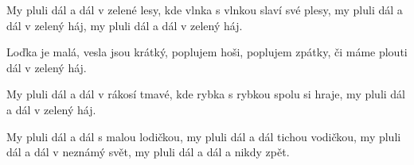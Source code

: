 
\beginverse{}
My pluli dál a dál v zelené lesy,
kde vlnka s vlnkou slaví své plesy,
my pluli dál a dál v zelený háj,
my pluli dál a dál v zelený háj.
\endverse{}

\beginverse{}
Loďka je malá, vesla jsou krátký,
poplujem hoši, poplujem zpátky,
\lrep{} či máme plouti dál v zelený háj. \rrep{}
\endverse{}

\beginverse{}
My pluli dál a dál v rákosí tmavé,
kde rybka s rybkou spolu si hraje,
\lrep{} my pluli dál a dál v zelený háj. \rrep{}
\endverse{}

\beginverse{}
My pluli dál a dál s malou lodičkou,
my pluli dál a dál tichou vodičkou,
my pluli dál a dál v neznámý svět,
my pluli dál a dál a nikdy zpět.
\endverse{}

\endsong{}
